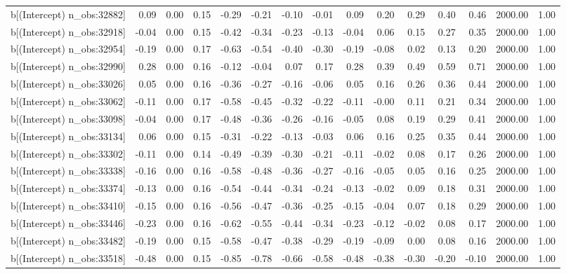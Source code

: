 \begin{table}[ht]
\begin{tabular}{rrrrrrrrrrrrrrr}
  b[(Intercept) n\_obs:32882] & 0.09 & 0.00 & 0.15 & -0.29 & -0.21 & -0.10 & -0.01 & 0.09 & 0.20 & 0.29 & 0.40 & 0.46 & 2000.00 & 1.00 \\ 
  b[(Intercept) n\_obs:32918] & -0.04 & 0.00 & 0.15 & -0.42 & -0.34 & -0.23 & -0.13 & -0.04 & 0.06 & 0.15 & 0.27 & 0.35 & 2000.00 & 1.00 \\ 
  b[(Intercept) n\_obs:32954] & -0.19 & 0.00 & 0.17 & -0.63 & -0.54 & -0.40 & -0.30 & -0.19 & -0.08 & 0.02 & 0.13 & 0.20 & 2000.00 & 1.00 \\ 
  b[(Intercept) n\_obs:32990] & 0.28 & 0.00 & 0.16 & -0.12 & -0.04 & 0.07 & 0.17 & 0.28 & 0.39 & 0.49 & 0.59 & 0.71 & 2000.00 & 1.00 \\ 
  b[(Intercept) n\_obs:33026] & 0.05 & 0.00 & 0.16 & -0.36 & -0.27 & -0.16 & -0.06 & 0.05 & 0.16 & 0.26 & 0.36 & 0.44 & 2000.00 & 1.00 \\ 
  b[(Intercept) n\_obs:33062] & -0.11 & 0.00 & 0.17 & -0.58 & -0.45 & -0.32 & -0.22 & -0.11 & -0.00 & 0.11 & 0.21 & 0.34 & 2000.00 & 1.00 \\ 
  b[(Intercept) n\_obs:33098] & -0.04 & 0.00 & 0.17 & -0.48 & -0.36 & -0.26 & -0.16 & -0.05 & 0.08 & 0.19 & 0.29 & 0.41 & 2000.00 & 1.00 \\ 
  b[(Intercept) n\_obs:33134] & 0.06 & 0.00 & 0.15 & -0.31 & -0.22 & -0.13 & -0.03 & 0.06 & 0.16 & 0.25 & 0.35 & 0.44 & 2000.00 & 1.00 \\ 
  b[(Intercept) n\_obs:33302] & -0.11 & 0.00 & 0.14 & -0.49 & -0.39 & -0.30 & -0.21 & -0.11 & -0.02 & 0.08 & 0.17 & 0.26 & 2000.00 & 1.00 \\ 
  b[(Intercept) n\_obs:33338] & -0.16 & 0.00 & 0.16 & -0.58 & -0.48 & -0.36 & -0.27 & -0.16 & -0.05 & 0.05 & 0.16 & 0.25 & 2000.00 & 1.00 \\ 
  b[(Intercept) n\_obs:33374] & -0.13 & 0.00 & 0.16 & -0.54 & -0.44 & -0.34 & -0.24 & -0.13 & -0.02 & 0.09 & 0.18 & 0.31 & 2000.00 & 1.00 \\ 
  b[(Intercept) n\_obs:33410] & -0.15 & 0.00 & 0.16 & -0.56 & -0.47 & -0.36 & -0.25 & -0.15 & -0.04 & 0.07 & 0.18 & 0.29 & 2000.00 & 1.00 \\ 
  b[(Intercept) n\_obs:33446] & -0.23 & 0.00 & 0.16 & -0.62 & -0.55 & -0.44 & -0.34 & -0.23 & -0.12 & -0.02 & 0.08 & 0.17 & 2000.00 & 1.00 \\ 
  b[(Intercept) n\_obs:33482] & -0.19 & 0.00 & 0.15 & -0.58 & -0.47 & -0.38 & -0.29 & -0.19 & -0.09 & 0.00 & 0.08 & 0.16 & 2000.00 & 1.00 \\ 
  b[(Intercept) n\_obs:33518] & -0.48 & 0.00 & 0.15 & -0.85 & -0.78 & -0.66 & -0.58 & -0.48 & -0.38 & -0.30 & -0.20 & -0.10 & 2000.00 & 1.00 \\ 

\end{tabular}
\end{table}
